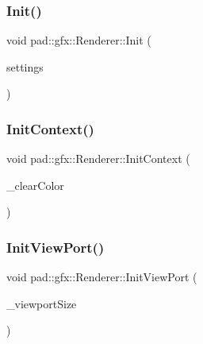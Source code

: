 \mbox{\label{classpad_1_1gfx_1_1_renderer_a28ca09b90cf50729dcca9e6c6e7150d3}} 
\subsubsection{\texorpdfstring{Init()}{Init()}}
{\footnotesize\ttfamily void pad\+::gfx\+::\+Renderer\+::\+Init (\begin{DoxyParamCaption}\item[{const \mbox{\hyperlink{structpad_1_1gfx_1_1_render_settings}{Render\+Settings}} \&}]{settings }\end{DoxyParamCaption})}

\mbox{\label{classpad_1_1gfx_1_1_renderer_a231a9121b1b95e52eae5fab21cd8785c}} 
\subsubsection{\texorpdfstring{Init\+Context()}{InitContext()}}
{\footnotesize\ttfamily void pad\+::gfx\+::\+Renderer\+::\+Init\+Context (\begin{DoxyParamCaption}\item[{const \mbox{\hyperlink{namespacepad_1_1math_a4eb77014ac7b74bd24cf73bca82ac3a3}{math\+::\+Vec4f}} \&}]{\+\_\+clear\+Color }\end{DoxyParamCaption})\hspace{0.3cm}{\ttfamily [private]}}

\mbox{\label{classpad_1_1gfx_1_1_renderer_a403e00bd5a3c5f91c5505332dda41a3e}} 
\subsubsection{\texorpdfstring{Init\+View\+Port()}{InitViewPort()}}
{\footnotesize\ttfamily void pad\+::gfx\+::\+Renderer\+::\+Init\+View\+Port (\begin{DoxyParamCaption}\item[{const \mbox{\hyperlink{namespacepad_1_1math_a808a631a6bccd994f9589d7fb86bad41}{math\+::\+Vec2i}} \&}]{\+\_\+viewport\+Size }\end{DoxyParamCaption})\hspace{0.3cm}{\ttfamily [private]}}

